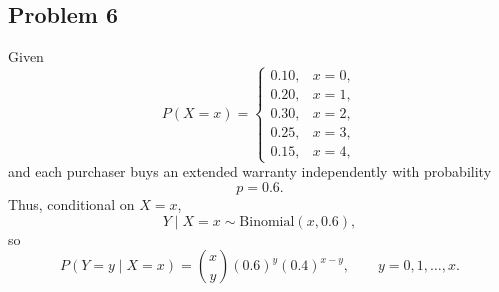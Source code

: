 \documentclass[11pt]{article}
\begin{document}
\subsection*{Problem 6}

Given
\[
P(X=x)=
\begin{cases}
0.10, & x=0,\\
0.20, & x=1,\\
0.30, & x=2,\\
0.25, & x=3,\\
0.15, & x=4,
\end{cases}
\]
and each purchaser buys an extended warranty independently with probability
\[
p=0.6.
\]
Thus, conditional on $X=x$,
\[
Y \mid X=x \sim \text{Binomial}(x,0.6),
\]
so
\[
P(Y=y\mid X=x)=\binom{x}{y}(0.6)^y(0.4)^{x-y}, \qquad y=0,1,\dots,x.
\]
\end{document}
